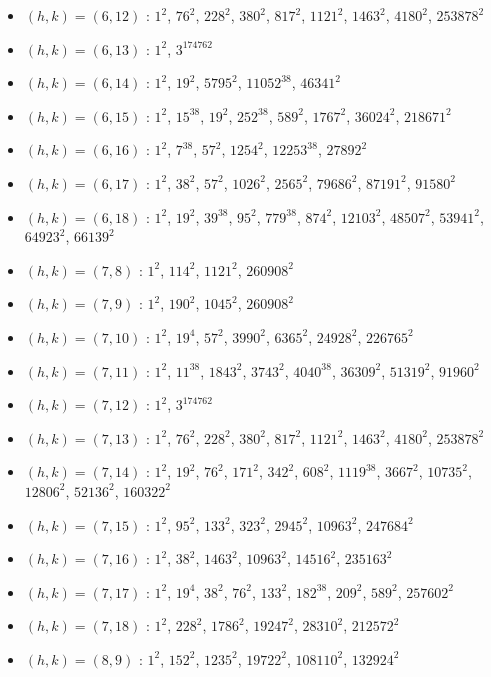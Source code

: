 \begin{itemize}
\item $(h,k)=(6,12)$ : $1^{2}$, $76^{2}$, $228^{2}$, $380^{2}$, $817^{2}$, $1121^{2}$, $1463^{2}$, $4180^{2}$, $253878^{2}$
\item $(h,k)=(6,13)$ : $1^{2}$, $3^{174762}$
\item $(h,k)=(6,14)$ : $1^{2}$, $19^{2}$, $5795^{2}$, $11052^{38}$, $46341^{2}$
\item $(h,k)=(6,15)$ : $1^{2}$, $15^{38}$, $19^{2}$, $252^{38}$, $589^{2}$, $1767^{2}$, $36024^{2}$, $218671^{2}$
\item $(h,k)=(6,16)$ : $1^{2}$, $7^{38}$, $57^{2}$, $1254^{2}$, $12253^{38}$, $27892^{2}$
\item $(h,k)=(6,17)$ : $1^{2}$, $38^{2}$, $57^{2}$, $1026^{2}$, $2565^{2}$, $79686^{2}$, $87191^{2}$, $91580^{2}$
\item $(h,k)=(6,18)$ : $1^{2}$, $19^{2}$, $39^{38}$, $95^{2}$, $779^{38}$, $874^{2}$, $12103^{2}$, $48507^{2}$, $53941^{2}$, $64923^{2}$, $66139^{2}$
\item $(h,k)=(7,8)$ : $1^{2}$, $114^{2}$, $1121^{2}$, $260908^{2}$
\item $(h,k)=(7,9)$ : $1^{2}$, $190^{2}$, $1045^{2}$, $260908^{2}$
\item $(h,k)=(7,10)$ : $1^{2}$, $19^{4}$, $57^{2}$, $3990^{2}$, $6365^{2}$, $24928^{2}$, $226765^{2}$
\item $(h,k)=(7,11)$ : $1^{2}$, $11^{38}$, $1843^{2}$, $3743^{2}$, $4040^{38}$, $36309^{2}$, $51319^{2}$, $91960^{2}$
\item $(h,k)=(7,12)$ : $1^{2}$, $3^{174762}$
\item $(h,k)=(7,13)$ : $1^{2}$, $76^{2}$, $228^{2}$, $380^{2}$, $817^{2}$, $1121^{2}$, $1463^{2}$, $4180^{2}$, $253878^{2}$
\item $(h,k)=(7,14)$ : $1^{2}$, $19^{2}$, $76^{2}$, $171^{2}$, $342^{2}$, $608^{2}$, $1119^{38}$, $3667^{2}$, $10735^{2}$, $12806^{2}$, $52136^{2}$, $160322^{2}$
\item $(h,k)=(7,15)$ : $1^{2}$, $95^{2}$, $133^{2}$, $323^{2}$, $2945^{2}$, $10963^{2}$, $247684^{2}$
\item $(h,k)=(7,16)$ : $1^{2}$, $38^{2}$, $1463^{2}$, $10963^{2}$, $14516^{2}$, $235163^{2}$
\item $(h,k)=(7,17)$ : $1^{2}$, $19^{4}$, $38^{2}$, $76^{2}$, $133^{2}$, $182^{38}$, $209^{2}$, $589^{2}$, $257602^{2}$
\item $(h,k)=(7,18)$ : $1^{2}$, $228^{2}$, $1786^{2}$, $19247^{2}$, $28310^{2}$, $212572^{2}$
\item $(h,k)=(8,9)$ : $1^{2}$, $152^{2}$, $1235^{2}$, $19722^{2}$, $108110^{2}$, $132924^{2}$

\end{itemize}

